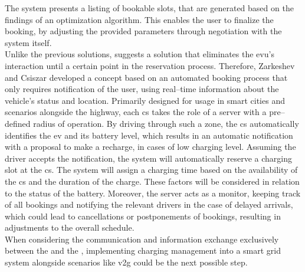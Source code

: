 The system presents a listing of bookable slots, that are generated based on the findings of an optimization algorithm. This enables the user to finalize the booking, by adjusting the provided parameters through negotiation with the system itself. \\
\noindent Unlike the previous solutions, \cite{zarkeshev_charging_2018} suggests a solution that eliminates the \acrshort{evu}'s interaction until a certain point in the reservation process.
Therefore, Zarkeshev and Csiszar developed a concept based on an automated booking process that only requires notification of the user, using real--time information about the vehicle's status and location.
Primarily designed for usage in smart cities and scenarios alongside the highway, each \acrshort{cs} takes the role of a server with a pre--defined radius of operation. By driving through such a zone, the \acrshort{cs} automatically identifies the \acrshort{ev} and its battery level, which results in an automatic notification with a proposal to make a recharge, in cases of low charging level.
Assuming the driver accepts the notification, the system will automatically reserve a charging slot at the \acrshort{cs}. The system will assign a charging time based on the availability of the \acrshort{cs} and the duration of the charge. These factors will be considered in relation to the status of the battery.
Moreover, the server acts as a monitor, keeping track of all bookings and notifying the relevant drivers in the case of delayed arrivals, which could lead to cancellations or postponements of bookings, resulting in adjustments to the overall schedule. \\
\noindent When considering the communication and information exchange exclusively between the  and the , implementing charging management into a smart grid system alongside scenarios like \acrshort{v2g} could be the next possible step.
